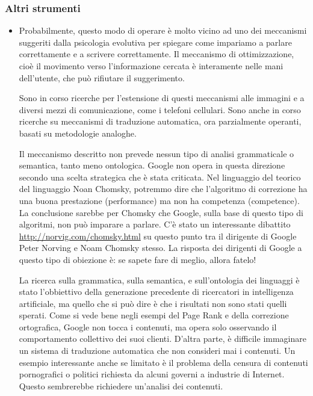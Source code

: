 \documentclass[xcolor=svgnames]{beamer}
\begin{document}
\begin{frame}\small\frametitle{Altri strumenti}
 
  \begin{itemize}
    \item Probabilmente, questo modo di operare è molto vicino ad uno dei meccanismi suggeriti dalla psicologia evolutiva per spiegare come impariamo a parlare correttamente e a scrivere correttamente. Il meccanismo di ottimizzazione, cioè il movimento verso l'informazione cercata è interamente nelle mani dell'utente, che può rifiutare il suggerimento.

Sono in corso ricerche per l'estensione di questi meccanismi alle immagini e a diversi mezzi di comunicazione, come i telefoni cellulari. Sono anche in corso ricerche su meccanismi di traduzione automatica, ora parzialmente operanti, basati su metodologie analoghe.

Il meccanismo descritto non prevede nessun tipo di analisi grammaticale o semantica, tanto meno ontologica. Google non opera in questa direzione secondo una scelta strategica che è stata criticata. Nel linguaggio del teorico del linguaggio Noan Chomsky, potremmo dire che l'algoritmo di correzione ha una buona prestazione (performance) ma non ha competenza (competence). La conclusione sarebbe per Chomsky che Google, sulla base di questo tipo di algoritmi, non può imparare a parlare. C'è stato un interessante dibattito \url{http://norvig.com/chomsky.html} su questo punto tra il dirigente di Google Peter Norving e Noam Chomsky stesso. La risposta dei dirigenti di Google a questo tipo di obiezione è: se sapete fare di meglio, allora fatelo!

La ricerca sulla grammatica, sulla semantica, e sull'ontologia dei linguaggi è stato l'obbiettivo della generazione precedente di ricercatori in intelligenza artificiale, ma quello che si può dire è che i risultati non sono stati quelli sperati. Come si vede bene negli esempi del Page Rank e della correzione ortografica, Google non tocca i contenuti, ma opera solo osservando il comportamento collettivo dei suoi clienti. D'altra parte, è difficile immaginare un sistema di traduzione automatica che non consideri mai i contenuti. Un esempio interessante anche se limitato è il problema della censura di contenuti pornografici o politici richiesta da alcuni governi a industrie di Internet. Questo sembrerebbe richiedere un'analisi dei contenuti.


\end{itemize}
\end{frame}
\end{document}
